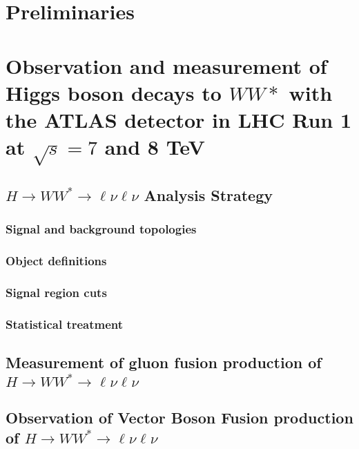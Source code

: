 \documentclass{Dissertate}
\begin{document}

\maketitle
\copyrightpage

\abstractpage
\tableofcontents
\listoffigures
\dedicationpage
\acknowledgments

\doublespacing

\setcounter{chapter}{-1}  %

\part{Preliminaries}


%
\part{Observation and measurement of Higgs boson decays to $WW*$ with
  the ATLAS detector in LHC Run 1 at $\sqrt{s} = 7$ and 8 TeV}

\chapter{$H\rightarrow WW^{*}\rightarrow \ell\nu\ell\nu$ Analysis Strategy}

\section{Signal and background topologies}
\section{Object definitions}
\section{Signal region cuts}
\section{Statistical treatment}

\chapter{Measurement of gluon fusion production of $H\rightarrow WW^{*}\rightarrow \ell\nu\ell\nu$}

\chapter{Observation of Vector Boson Fusion production of $H\rightarrow WW^{*}\rightarrow \ell\nu\ell\nu$}
\end{document}
